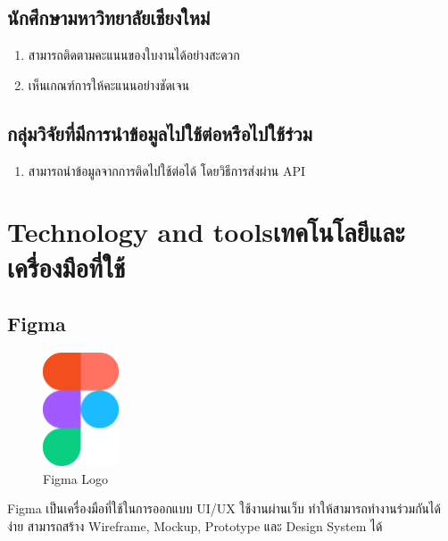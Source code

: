     \subsection{นักศึกษามหาวิทยาลัยเชียงใหม่}
        \begin{enumerate}
            \renewcommand{\labelenumii}{\theenumi.\arabic{enumii}}
            \item สามารถติดตามคะแนนของใบงานได้อย่างสะดวก
            \item เห็นเกณฑ์การให้คะแนนอย่างชัดเจน
        \end{enumerate}

    \subsection{กลุ่มวิจัยที่มีการนำข้อมูลไปใช้ต่อหรือไปใช้ร่วม}
        \begin{enumerate}
            \renewcommand{\labelenumii}{\theenumi.\arabic{enumii}}
            \item สามารถนำข้อมูลจากการติดไปใช้ต่อได้ โดยวิธีการส่งผ่าน API
        \end{enumerate}

\section{\ifenglish Technology and tools\else เทคโนโลยีและเครื่องมือที่ใช้\fi}
\subsection{Figma}
    \begin{figure}[ht]
        \centering
        \includegraphics[width=0.2\textwidth, keepaspectratio]{image/Tools/figma-logo.png}
        \caption[Figma Logo]{Figma Logo\footnotemark}
        \label{fig:figma_logo}
    \end{figure}
    \FloatBarrier
    \qquad Figma เป็นเครื่องมือที่ใช้ในการออกแบบ UI/UX ใช้งานผ่านเว็บ ทำให้สามารถทำงานร่วมกันได้ง่าย สามารถสร้าง Wireframe, Mockup, Prototype และ Design System ได้
